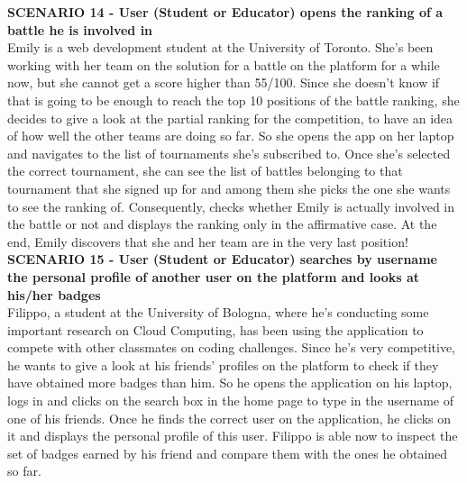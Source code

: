     \textbf{SCENARIO 14 - User (Student or Educator) opens the ranking of a battle he is involved in}\\
     Emily is a web development student at the University of Toronto. She's been working with her team on the solution for a battle on the \app platform for a while now, but she cannot get a score higher than 55/100. Since she doesn't know if that is going to be enough to reach the top 10 positions of the battle ranking, she decides to give a look at the partial ranking for the competition, to have an idea of how well the other teams are doing so far. So she opens the \app app on her laptop and navigates to the list of tournaments she's subscribed to. Once she's selected the correct tournament, she can see the list of battles belonging to that tournament that she signed up for and among them she picks the one she wants to see the ranking of. Consequently, \app checks whether Emily is actually involved in the battle or not and displays the ranking only in the affirmative case. 
     At the end, Emily discovers that she and her team are in the very last position!\\

    \textbf{SCENARIO 15 - User (Student or Educator) searches by username the personal profile of another user on the platform and looks at his/her badges}\\
    Filippo, a student at the University of Bologna, where he's conducting some important research on Cloud Computing, has been using the \app application to compete with other classmates on coding challenges. Since he's very competitive, he wants to give a look at his friends' profiles on the platform to check if they have obtained more badges than him. So he opens the \app application on his laptop, logs in and clicks on the search box in the home page to type in the username of one of his friends. Once he finds the correct user on the application, he clicks on it and \app displays the personal profile of this user. Filippo is able now to inspect the set of badges earned by his friend and compare them with the ones he obtained so far.\\